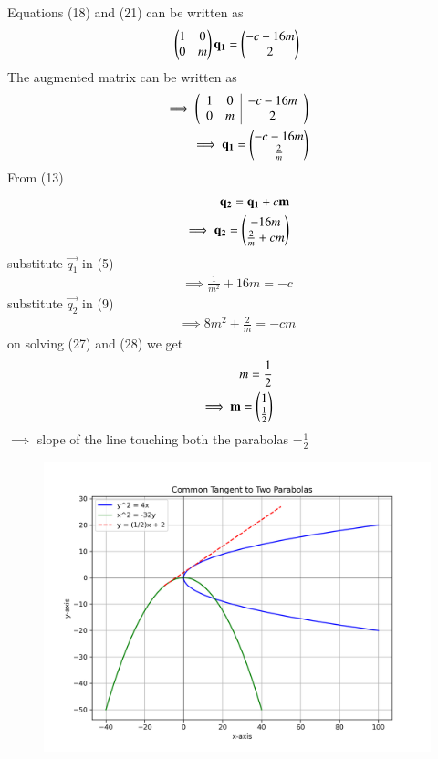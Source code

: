 \documentclass[journal]{IEEEtran}
\begin{document}
Equations (18) and (21) can be written  as
\begin{align}
    \begin{pmatrix}
        1 & 0\\
        0 & m
    \end{pmatrix} \mathbf{q_1}=\begin{pmatrix}-c-16m\\2\end{pmatrix}
\end{align}
The augmented matrix can be written as
\begin{align}
      \implies \left(\begin{array}{cc|c}
        1 & 0 & -c-16m \\
        0 & m & 2 
\end{array}\right)\\
\implies \mathbf{q_1}=\begin{pmatrix}-c-16m\\ \frac{2}{m}\end{pmatrix}
\end{align}
From (13)
\begin{align}
\mathbf{q_2}=\mathbf{q_1} + c\mathbf{m}\\
  \implies  \mathbf{q_2}=\begin{pmatrix}-16m\\ \frac{2}{m}+cm\end{pmatrix}
\end{align}
substitute $\vec{q_1}$ in (5)
\begin{align}
    \implies \frac{1}{{m}^2} + 16m=-c
\end{align}
substitute $\vec{q_2}$ in (9)
\begin{align}
   \implies  8m^2 + \frac{2}{m}=-cm
\end{align}
on solving (27) and (28) we get 
\begin{align}
    m=\frac{1}{2}\\
    \implies \mathbf{m}=\begin{pmatrix}1\\ \frac{1}{2}\end{pmatrix}
\end{align}
$\implies$ slope of the line touching both the parabolas =$\frac{1}{2}$
\begin{figure}[H]
    \centering
    \includegraphics[width=0.8\columnwidth]{figs/01.png}
    \caption{}
    \label{fig:placeholder}
\end{figure}
\end{document}
